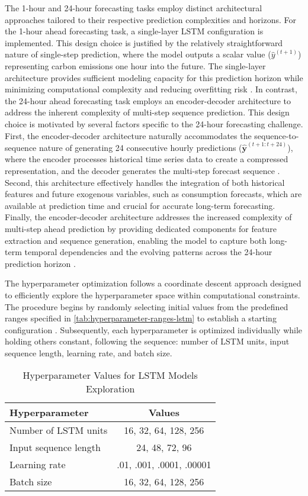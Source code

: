The 1-hour and 24-hour forecasting tasks employ distinct architectural approaches tailored to their respective prediction complexities and horizons. For the 1-hour ahead forecasting task, a single-layer LSTM configuration is implemented. This design choice is justified by the relatively straightforward nature of single-step prediction, where the model outputs a scalar value (\(\hat{y}^{(t+1)}\)) representing carbon emissions one hour into the future. The single-layer architecture provides sufficient modeling capacity for this prediction horizon while minimizing computational complexity and reducing overfitting risk \parencite{greff2017}. In contrast, the 24-hour ahead forecasting task employs an encoder-decoder architecture to address the inherent complexity of multi-step sequence prediction. This design choice is motivated by several factors specific to the 24-hour forecasting challenge. First, the encoder-decoder architecture naturally accommodates the sequence-to-sequence nature of generating 24 consecutive hourly predictions (\(\mathbf{\hat{y}}^{(t+1:t+24)}\)), where the encoder processes historical time series data to create a compressed representation, and the decoder generates the multi-step forecast sequence \parencite{sutskever2014}. Second, this architecture effectively handles the integration of both historical features and future exogenous variables, such as consumption forecasts, which are available at prediction time and crucial for accurate long-term forecasting. Finally, the encoder-decoder architecture addresses the increased complexity of multi-step ahead prediction by providing dedicated components for feature extraction and sequence generation, enabling the model to capture both long-term temporal dependencies and the evolving patterns across the 24-hour prediction horizon \parencite{he2024}.

The hyperparameter optimization follows a coordinate descent approach designed to efficiently explore the hyperparameter space within computational constraints. The procedure begins by randomly selecting initial values from the predefined ranges specified in \autoref{tab:hyperparameter-ranges-lstm} to establish a starting configuration \parencite{bergstra2018}. Subsequently, each hyperparameter is optimized individually while holding others constant, following the sequence: number of LSTM units, input sequence length, learning rate, and batch size.

\begin{table}[ht]
  \centering
  \begin{tabular}{lc}
    \hline
    \textbf{Hyperparameter} & \textbf{Values}          \\ \hline
    Number of LSTM units    & 16, 32, 64, 128, 256     \\
    Input sequence length   & 24, 48, 72, 96           \\
    Learning rate           & .01, .001, .0001, .00001 \\
    Batch size              & 16, 32, 64, 128, 256     \\ \hline
  \end{tabular}
  \caption{Hyperparameter Values for LSTM Models Exploration}
  \label{tab:hyperparameter-ranges-lstm}
\end{table}


